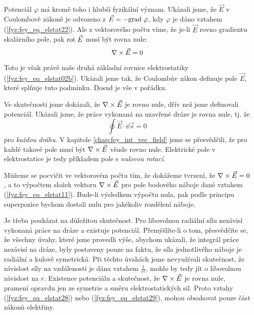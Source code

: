     Potenciál \(\varphi\) má kromě toho i hlubší fyzikální význam. Ukázali jsme, že \(\vec{E}\) v 
    Coulombově zákoně je odvozeno z \(\vec{E}= -\mathrm{grad\;}\varphi\), kdy \(\varphi\) je dáno vztahem 
    (\ref{fyz:fey_eq_elstat22}). Ale z vektorového počtu víme, že je-li \(\vec{E}\) rovno gradientu 
    skalárního pole, pak \(\mathrm{rot}\;\vec{E}\) musí být rovna nule:
    \begin{equation}\label{fyz:fey_eq_elstat29}
     \nabla\times\vec{E} = 0 
    \end{equation}
    
    Toto je však právě naše druhá základní rovnice elektrostatiky (\ref{fyz:fey_eq_elstat02b}). 
    Ukázali jsme tak, že Coulombův zákon definuje pole \(\vec{E}\), které splňuje tuto podmínku. 
    Dosud je vše v pořádku.
    
    Ve skutečnosti jsme dokázali, že \(\nabla\times\vec{E}\) je rovno nule, dřív než jsme definovali potenciál. 
    Ukázali jsme, že práce vykonaná na uzavřené dráze je rovna nule, tj. že
    \begin{equation*}
     \oint\vec{E}\cdot\dd{\vec{s}} = 0 
    \end{equation*}  
    pro \emph{každou dráhu}. V kapitole \ref{chap:fey_int_vec_field} jsme se přesvědčili, že pro 
    každé takové pole musí být \(\nabla\times\vec{E}\) všude rovno nule. Elektrické pole v elektrostatice je 
    tedy příkladem pole s \emph{nulovou rotací}. 
    
    Můžeme se pocvičit ve vektorovém počtu tím, že dokážeme tvrzení, že \(\nabla\times\vec{E}=0\), a to 
    výpočtem složek vektoru \(\nabla\times\vec{E}\) pro pole bodového náboje dané vztahem 
    (\ref{fyz:fey_eq_elstat11}). Bude-li výsledkem výpočtu nula, pak podle principu superpozice 
    bychom dostali nulu pro jakékoliv rozdělení náboje.
    
    Je třeba poukázat na důležitou skutečnost. Pro libovolnou radiální sílu nezávisí vykonaná práce 
    na dráze a existuje potenciál. Přemýšlíte-li o tom, přesvědčíte se, že všechny úvahy, které jsme 
    provedli výše, abychom ukázali, že integrál práce nezávisí na dráze, byly postaveny pouze na 
    faktu, že síla jednotlivého náboje je radiální a kulově symetrická. Při těchto úvahách jsme 
    nevyužívali skutečnost, že závislost síly na vzdálenosti je dána vztahem \(\frac{1}{r^2}\), 
    mohlo by tedy jít o libovolnou závislost na \(r\). Existence potenciálu a skutečnost, že 
    \(\nabla\times\vec{E}\) je rovna nule, pramení opravdu jen ze symetrie a směru elektrostatických sil. Proto 
    vztahy (\ref{fyz:fey_eq_elstat28}) nebo (\ref{fyz:fey_eq_elstat29}), mohou obsahovat pouze část 
    zákonů elektřiny. 
 
